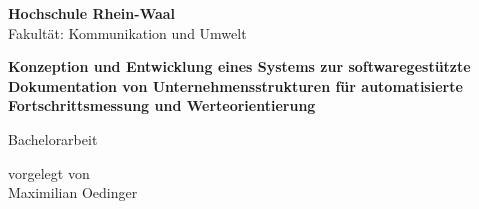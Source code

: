 \begin{titlepage}
    \begin{center}
        \vspace{0.5cm}
        \Large{
            \textbf{Hochschule Rhein-Waal}\\
            Fakultät: Kommunikation und Umwelt
        }

        \vspace{3cm}
        \vfill
        \LARGE{
            \textbf{Konzeption und Entwicklung eines Systems zur softwaregestützte Dokumentation von Unternehmensstrukturen für automatisierte Fortschrittsmessung und Werteorientierung 
        }}
        \vfill

        \vspace{1.5cm}
        \LARGE{Bachelorarbeit}
        
        \vfill

        \vspace{1cm}
        \large{vorgelegt von \\}
        \LARGE{Maximilian Oedinger}
    \end{center}
\end{titlepage}